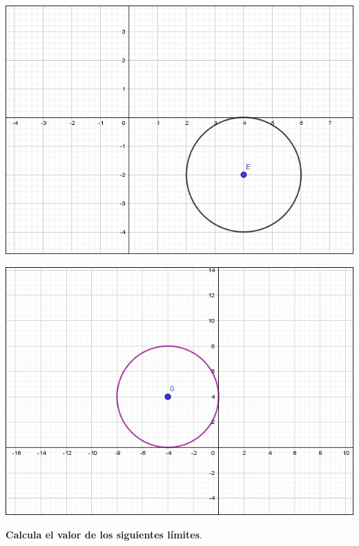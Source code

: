 \documentclass[12pt, addpoints, answers]{exam}
\begin{document}
\begin{questions}
\begin{minipage}[t]{0.23\linewidth}
 	\includegraphics[width=1\linewidth]{Figuras/fig11}
 \end{minipage}\hfill 
 \begin{minipage}[t]{0.23\linewidth}
 	\includegraphics[width=1\linewidth]{Figuras/fig12}
 \end{minipage} 
\question[1] \textbf{Calcula el valor de los siguientes límites}.
\end{questions}
\end{document}
